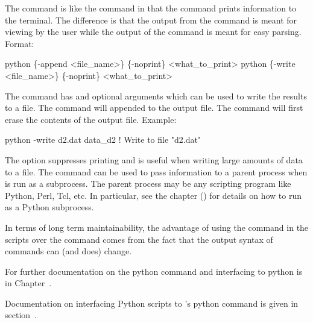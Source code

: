 The  command is like the  command in that the  command
prints information to the terminal. The difference is that the output from the 
command is meant for viewing by the user while the output of the  command is
meant for easy parsing. Format:
\begin{example}
  python \{-append <file_name>\} \{-noprint\} <what_to_print>
  python \{-write <file_name>\} \{-noprint\} <what_to_print>
\end{example}

The  command has  and  optional arguments which can be
used to write the results to a file. The  command will appended to the
output file. The  command will first erase the contents of the output
file. Example:
\begin{example}
  python -write d2.dat data_d2    ! Write to file "d2.dat"
\end{example}

The  option suppresses printing and is useful when writing large amounts of data to a
file.  The  command can be used to pass information to a parent process when \tao is run
as a subprocess.  The parent process may be any scripting program like Python, Perl, Tcl, etc.  In
particular, see the  chapter () for details on how to run
\tao as a Python subprocess.

In terms of long term maintainability, the advantage of using the  command in the scripts
over the  command comes from the fact that the output syntax of  commands can
(and does) change.

For further documentation on the python command and interfacing to python is in Chapter~.

Documentation on interfacing Python scripts to \tao's python command is given in
section~.

